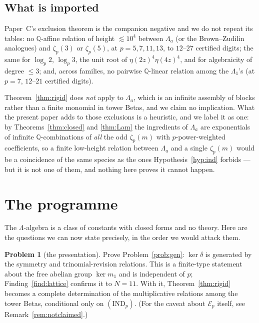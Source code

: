 \documentclass[11pt,reqno]{article}
\newcommand{\QQ}{\mathbb{Q}}
\newcommand{\El}{\mathcal{E}_p}
\theoremstyle{plain}
\theoremstyle{definition}
\newtheorem{problem}[theorem]{Problem}
\theoremstyle{remark}
\numberwithin{equation}{section}
\begin{document}
\subsection{What is imported}

Paper~C's exclusion theorem \cite[\S5]{PaperC} is the companion negative and we
do not repeat its tables: no $\QQ$-affine relation of height $\lesssim10^4$
between $\Lambda_a$ (or the Brown--Zudilin analogues) and $\zeta_p(3)$ or
$\zeta_p(5)$, at $p=5,7,11,13$, to $12$--$27$ certified digits; the same for
$\log_p2$, $\log_p3$, the unit root of $\eta(2z)^4\eta(4z)^4$, and for
algebraicity of degree $\le3$; and, across families, no pairwise $\QQ$-linear
relation among the $\Lambda_1$'s (at $p=7$, $12$--$21$ certified digits).

Theorem~\ref{thm:rigid} does \emph{not} apply to $\Lambda_a$, which is an
infinite assembly of blocks rather than a finite monomial in tower Betas, and we
claim no implication.  What the present paper adds to those exclusions is a
heuristic, and we label it as one: by Theorems~\ref{thm:closed} and
\ref{thm:Lam} the ingredients of $\Lambda_a$ are exponentials of infinite
$\QQ$-combinations of \emph{all} the odd $\zeta_p(m)$ with $p$-power-weighted
coefficients, so a finite low-height relation between $\Lambda_a$ and a single
$\zeta_p(m)$ would be a coincidence of the same species as the ones
Hypothesis~\ref{hyp:ind} forbids --- but it is not one of them, and nothing here
proves it cannot happen.

\section{The programme}\label{sec:programme}

The $\Lambda$-algebra is a class of constants with closed forms and no theory.
Here are the questions we can now state precisely, in the order we would attack
them.

\begin{problem}[the presentation]\label{prob:present}
Prove Problem~\ref{prob:gen}: $\ker\delta$ is generated by the symmetry and
trinomial-revision relations.  This is a finite-type statement about the free
abelian group $\ker m_1$ and is independent of $p$; Finding~\ref{find:lattice}
confirms it to $N=11$.  With it, Theorem~\ref{thm:rigid} becomes a complete
determination of the multiplicative relations among the tower Betas, conditional
only on $(\mathrm{IND}_p)$.  (For the caveat about $\El$ itself, see
Remark~\ref{rem:notclaimed}.)
\end{problem}
\end{document}
